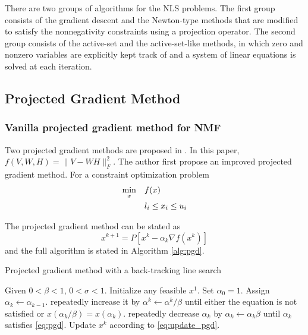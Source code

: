 \documentclass[conference,onecolumn,12pt]{IEEEtran}
\numberwithin{equation}{section}
\numberwithin{figure}{section}
\numberwithin{table}{section}
\theoremstyle{definition}
\begin{document}
There are two groups of algorithms for the NLS problems. The first group consists of the gradient descent and the Newton-type methods that are modified to satisfy the nonnegativity constraints using a projection operator. The second group consists of the active-set and the active-set-like methods, in which zero and nonzero variables are explicitly kept track of and a system of linear equations is solved at each iteration.

\subsection{Projected Gradient Method}

\subsubsection{Vanilla projected gradient method for NMF}
Two projected gradient methods are proposed in \cite{6795860}. In this paper, $f(V,W,H)=\|V-WH\|_F^2$. The author first propose an improved projected gradient method.
For a constraint optimization problem
\begin{equation}
	\begin{split}
		\min_x&\quad f(x)\\
{\rm }&\quad l_i\leq x_i\leq u_i
	\end{split}
\end{equation}

The projected gradient method can be stated as
\begin{equation}
	\label{eq:update_pgd}
	x^{k+1}=P[x^k-\alpha_k\nabla f(x^k)]
\end{equation}
and the full algorithm is stated in Algorithm \ref{alg:pgd}.
\begin{algorithm}
	\caption{Projected gradient method with a back-tracking line search} 
	\begin{algorithmic}[1]
		\State Given $0 < \beta < 1$, $0 < \sigma < 1$. Initialize any feasible $x^1$. Set $\alpha_0=1$.
		\State Assign $\alpha_k\gets \alpha_{k-1}$.
		repeatedly increase it by $\alpha^k\gets \alpha^k/\beta$ until either the equation is not satisfied or $x(\alpha_k/\beta)=x(\alpha_k)$.
		\Else repeatedly decrease $\alpha_k$ by $\alpha_k\gets \alpha_k \beta$ until $\alpha_k$ satisfies \ref{eq:pgd}.
		\EndIf
		\State Update $x^k$ according to \ref{eq:update_pgd}.
		\EndFor
	\end{algorithmic} 
	\label{alg:pgd}
\end{algorithm}
\end{document}
